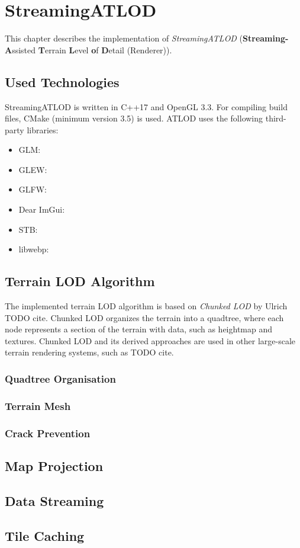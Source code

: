 \chapter{StreamingATLOD}
This chapter describes the implementation of \textit{StreamingATLOD} (\textbf{Streaming-A}ssisted 
\textbf{T}errain \textbf{L}evel \textbf{o}f \textbf{D}etail (Renderer)).

\section{Used Technologies}
StreamingATLOD is written in C++17 and OpenGL 3.3. For compiling build files,
CMake (minimum version 3.5) is used. ATLOD uses the following third-party
libraries:
\begin{itemize}
  \item GLM:
  \item GLEW:
  \item GLFW:
  \item Dear ImGui:
  \item STB:
  \item libwebp:
\end{itemize}


\section{Terrain LOD Algorithm}
The implemented terrain LOD algorithm is based on \textit{Chunked LOD} by Ulrich TODO cite.
Chunked LOD organizes the terrain into a quadtree, where each node represents a section of the terrain with data,
such as heightmap and textures. Chunked LOD and its derived approaches are used in other large-scale terrain rendering systems, such as 
TODO cite.

\subsection{Quadtree Organisation}


\subsection{Terrain Mesh}

\subsection{Crack Prevention}

\section{Map Projection}

\section{Data Streaming}

\section{Tile Caching}
